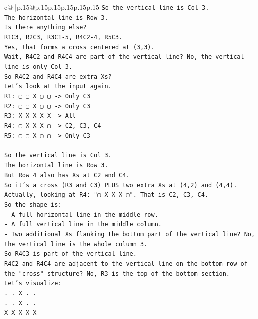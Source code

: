 \documentclass{article}
\begin{document}
{\begin{supertabular}{c@{$\;$}|p{.15\linewidth}@{}p{.15\linewidth}p{.15\linewidth}p{.15\linewidth}p{.15\linewidth}p{.15\linewidth}}
{{{\texttt{So the vertical line is Col 3.} \\
\texttt{The horizontal line is Row 3.} \\
\texttt{Is there anything else?} \\
\texttt{R1C3, R2C3, R3C1{-}5, R4C2{-}4, R5C3.} \\
\texttt{Yes, that forms a cross centered at (3,3).} \\
\texttt{Wait, R4C2 and R4C4 are part of the vertical line? No, the vertical line is only Col 3.} \\
\texttt{So R4C2 and R4C4 are extra Xs?} \\
\texttt{Let's look at the input again.} \\
\texttt{R1: ▢ ▢ X ▢ ▢ {-}> Only C3} \\
\texttt{R2: ▢ ▢ X ▢ ▢ {-}> Only C3} \\
\texttt{R3: X X X X X {-}> All} \\
\texttt{R4: ▢ X X X ▢ {-}> C2, C3, C4} \\
\texttt{R5: ▢ ▢ X ▢ ▢ {-}> Only C3} \\
\\ 
\texttt{So the vertical line is Col 3.} \\
\texttt{The horizontal line is Row 3.} \\
\texttt{But Row 4 also has Xs at C2 and C4.} \\
\texttt{So it's a cross (R3 and C3) PLUS two extra Xs at (4,2) and (4,4).} \\
\texttt{Actually, looking at R4: "▢ X X X ▢". That is C2, C3, C4.} \\
\texttt{So the shape is:} \\
\texttt{{-} A full horizontal line in the middle row.} \\
\texttt{{-} A full vertical line in the middle column.} \\
\texttt{{-} Two additional Xs flanking the bottom part of the vertical line? No, the vertical line is the whole column 3.} \\
\texttt{So R4C3 is part of the vertical line.} \\
\texttt{R4C2 and R4C4 are adjacent to the vertical line on the bottom row of the "cross" structure? No, R3 is the top of the bottom section.} \\
\texttt{Let's visualize:} \\
\texttt{. . X . .} \\
\texttt{. . X . .} \\
\texttt{X X X X X} \\
}}}
\end{supertabular}}
\end{document}
